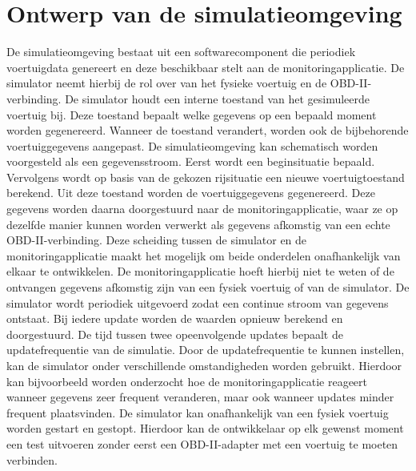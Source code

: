 \section{Ontwerp van de simulatieomgeving}
De simulatieomgeving bestaat uit een softwarecomponent die periodiek voertuigdata genereert en deze beschikbaar stelt aan de monitoringapplicatie. De simulator neemt hierbij de rol over van het fysieke voertuig en de OBD-II-verbinding.
De simulator houdt een interne toestand van het gesimuleerde voertuig bij. Deze toestand bepaalt welke gegevens op een bepaald moment worden gegenereerd. Wanneer de toestand verandert, worden ook de bijbehorende voertuiggegevens aangepast.
De simulatieomgeving kan schematisch worden voorgesteld als een gegevensstroom. Eerst wordt een beginsituatie bepaald. Vervolgens wordt op basis van de gekozen rijsituatie een nieuwe voertuigtoestand berekend. Uit deze toestand worden de voertuiggegevens gegenereerd. Deze gegevens worden daarna doorgestuurd naar de monitoringapplicatie, waar ze op dezelfde manier kunnen worden verwerkt als gegevens afkomstig van een echte OBD-II-verbinding.
Deze scheiding tussen de simulator en de monitoringapplicatie maakt het mogelijk om beide onderdelen onafhankelijk van elkaar te ontwikkelen. De monitoringapplicatie hoeft hierbij niet te weten of de ontvangen gegevens afkomstig zijn van een fysiek voertuig of van de simulator.
De simulator wordt periodiek uitgevoerd zodat een continue stroom van gegevens ontstaat. Bij iedere update worden de waarden opnieuw berekend en doorgestuurd. De tijd tussen twee opeenvolgende updates bepaalt de updatefrequentie van de simulatie.
Door de updatefrequentie te kunnen instellen, kan de simulator onder verschillende omstandigheden worden gebruikt. Hierdoor kan bijvoorbeeld worden onderzocht hoe de monitoringapplicatie reageert wanneer gegevens zeer frequent veranderen, maar ook wanneer updates minder frequent plaatsvinden.
De simulator kan onafhankelijk van een fysiek voertuig worden gestart en gestopt. Hierdoor kan de ontwikkelaar op elk gewenst moment een test uitvoeren zonder eerst een OBD-II-adapter met een voertuig te moeten verbinden.

